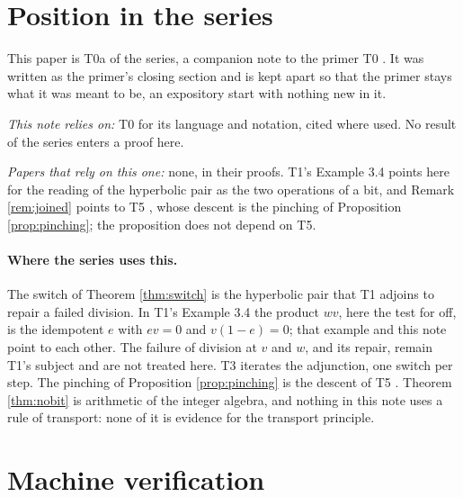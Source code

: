 \documentclass[11pt]{article}
\theoremstyle{plain}
\theoremstyle{definition}
\theoremstyle{plain}
\theoremstyle{definition}
\begin{document}
\section{Position in the series}\label{sec:position}

This paper is T0a of the series, a companion note to the primer T0 \cite{ButlerT0}. It was written as the primer's closing section and is kept apart so that the primer stays what it was meant to be, an expository start with nothing new in it.

\emph{This note relies on:} T0 \cite{ButlerT0} for its language and notation, cited where used. No result of the series enters a proof here.

\emph{Papers that rely on this one:} none, in their proofs. T1's Example 3.4 \cite{ButlerT1} points here for the reading of the hyperbolic pair as the two operations of a bit, and Remark \ref{rem:joined} points to T5 \cite{ButlerT5}, whose descent is the pinching of Proposition \ref{prop:pinching}; the proposition does not depend on T5.

\paragraph{Where the series uses this.} The switch of Theorem \ref{thm:switch} is the hyperbolic pair that T1 \cite{ButlerT1} adjoins to repair a failed division. In T1's Example 3.4 the product $wv$, here the test for off, is the idempotent $e$ with $ev = 0$ and $v(1 - e) = 0$; that example and this note point to each other. The failure of division at $v$ and $w$, and its repair, remain T1's subject and are not treated here. T3 \cite{ButlerT3} iterates the adjunction, one switch per step. The pinching of Proposition \ref{prop:pinching} is the descent of T5 \cite{ButlerT5}. Theorem \ref{thm:nobit} is arithmetic of the integer algebra, and nothing in this note uses a rule of transport: none of it is evidence for the transport principle.

\section{Machine verification}\label{sec:verification}
\end{document}
